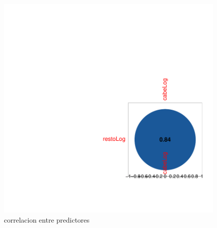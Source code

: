 


\begin{figure}[h]
\centering
\begin{adjustbox}{width=7cm,height=7cm,clip,trim=1.5cm 0.5cm 0cm 1.5cm}
\includegraphics{bivariada-corrPlotX}
\end{adjustbox}
\caption{correlacion entre predictores}
\label{corrPlotX}
\end{figure}


\clearpage


\endinput
